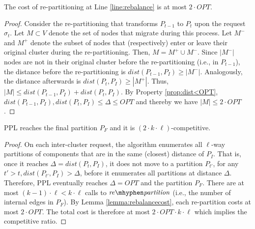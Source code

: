 \documentclass[manuscript,screen=true]{acmart}
\newcommand{\OPT}{\mathit{OPT}}
\newcommand\mahmoud[1]{\color{green}\textbf{\\ Mahmoud: #1}\\\color{black}}
\begin{document}
\begin{lemma}	\label{lemma:rebalancecost}
    The cost of re-partitioning at Line \ref{line:rebalance} is at most $2\cdot\OPT$.
\end{lemma}
\begin{proof}
    Consider the re-partitioning that transforms $P_{t-1}$ to $P_t$ upon the request $\sigma_t$.
    Let $M \subset V$ denote the set of nodes that migrate during this process.
	Let $M^-$ and $M^+$ denote the subset of nodes that (respectively)
    enter or leave their original cluster during the re-partitioning.    
    Then,
    $M = M^+ \cup M^-$.
    Since $|M^-|$ nodes are not in their original cluster before the re-partitioning (i.e., in $P_{t-1}$),
    the distance before the re-partitioning is $\mathit{dist}(P_{t-1},P_I) \geq | M^-|$.
    Analogously,
     the distance afterwards is $\mathit{dist}(P_{t},P_I) \geq | M^+|$.
    Thus,
    $|M| \leq \mathit{dist}(P_{t-1},P_I) + \mathit{dist}(P_{t},P_I)$.
    By Property \ref{prop:dist<OPT},
    $\mathit{dist}(P_{t-1},P_I) , \mathit{dist}(P_{t},P_I) \leq \Delta \leq \OPT$
    and thereby we have	
    $|M| \leq 2\cdot\OPT$.
\end{proof}

\begin{theorem}	\label{thm:upperbound}
    PPL reaches the final partition $P_F$ and it is $(2\cdot k\cdot\ell)$-competitive.
\end{theorem}
\begin{proof}
      On each inter-cluster request,
     the algorithm enumerates all $\ell$-way partitions of components
     that are in the same (closest) distance of $P_I$.
     That is, 
     once it reaches $\Delta = \mathit{dist} (P_{t}, P_I)$,
     it does not move to a partition
     $P_{t'}$, for any $t'>t,\mathit{dist} (P_{t'}, P_I) > \Delta$,
     before it enumerates all partitions at distance $\Delta$.
     Therefore,
     PPL eventually reaches $\Delta=\OPT$ and the partition $P_F$.
    There are at most $(k-1)\cdot\ell < k\cdot\ell $ calls   to $\mathit{re\mhyphen partition}$
     (i.e., the number of internal edges in $P_F$).
    By Lemma \ref{lemma:rebalancecost},
    each re-partition costs at most $2\cdot\OPT$.
    The total cost is therefore at most $2\cdot\OPT\cdot k\cdot\ell$ which implies the competitive ratio.
 \end{proof}
\end{document}
